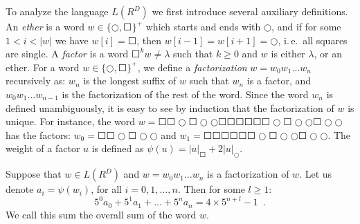 To analyze the language $L(R^D)$ we first introduce several auxiliary definitions. An \emph{ether} is a word $w \in \{\Circle, \Square\}^+$ which starts and ends with $\Circle$, and if for some $1 < i < |w|$ we have $w[i] = \Square$, then $w[i-1] = w[i+1] = \Circle$, i.\,e.\ all squares are single. A \emph{factor} is a word $\Square^k w \neq \lambda$ such that $k \ge 0$ and $w$ is either $\lambda$, or an ether. For a word $w \in \{\Circle, \Square\}^+$, we define a \emph{factorization} $w = w_0 w_1 \ldots w_n$ recursively as: $w_n$ is the longest suffix of $w$ such that $w_n$ is a factor, and $w_0 w_1 \ldots w_{n-1}$ is the factorization of the rest of the word. Since the word $w_n$ is defined unambiguously, it is easy to see by induction that the factorization of $w$ is unique. For instance, the word $w = \Square \Square \Circle \Square \Circle \Circle \Square \Square \Square \Square \Square \Square \Circle \Square \Circle \Circle \Square \Circle \Circle$ has the factors: $w_0 = \Square \Square \Circle \Square \Circle \Circle$ and $w_1 = \Square \Square \Square \Square \Square \Square \Circle \Square \Circle \Circle \Square \Circle \Circle$. The weight of a factor $u$ is defined as $\psi(u) = |u|_{\Square} + 2 |u|_{\Circle}$.

\begin{lemma}\label{lemma:circle-square-3clRA}
Suppose that $w \in L(R^D)$ and $w = w_0 w_1 \ldots w_n$ is a factorization of $w$. Let us denote $a_i = \psi(w_i)$, for all $i = 0, 1, \ldots, n$. Then for some $l \ge 1$:
$$
5^0 a_0 + 5^1 a_1 + \ldots + 5^n a_n = 4 \times 5^{n+l} - 1\enspace.
$$
We call this sum the overall sum of the word $w$.
\end{lemma}

